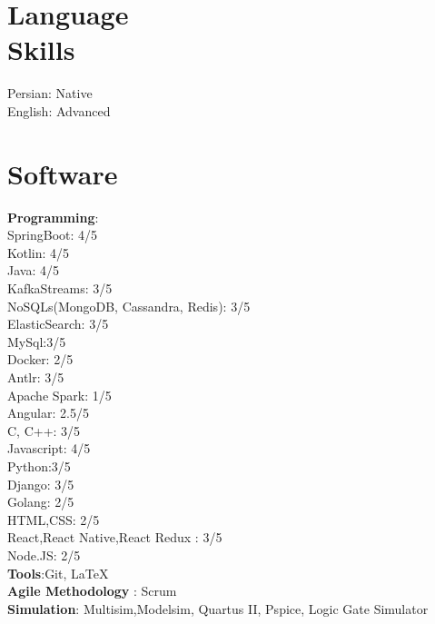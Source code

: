 \documentclass[line, mm]{sampleCV}
\begin{document}
\begin{resume}
    \section{\mysidestyle Language\\Skills}
Persian: Native\\
English: Advanced\\

    \section{\mysidestyle Software}

\textbf{Programming}:\\
SpringBoot: 4/5\\Kotlin: 4/5\\ Java: 4/5 \\ KafkaStreams: 3/5\\NoSQLs(MongoDB, Cassandra, Redis): 3/5 \\ ElasticSearch: 3/5  \\ MySql:3/5 \\Docker: 2/5 \\ Antlr: 3/5 \\  Apache Spark: 1/5\\
Angular: 2.5/5 \\
 C, C++: 3/5\\Javascript: 4/5\\Python:3/5\\ 
 Django: 3/5 \\
 Golang:  2/5 \\
 HTML,CSS: 2/5\\
 React,React Native,React Redux : 3/5 \\Node.JS: 2/5\\ 
\textbf{Tools}:Git, \LaTeX \\
\textbf{Agile Methodology} : Scrum \\
\textbf{Simulation}: Multisim,Modelsim, Quartus II, Pspice, Logic Gate Simulator

\end{resume}
\end{document}
